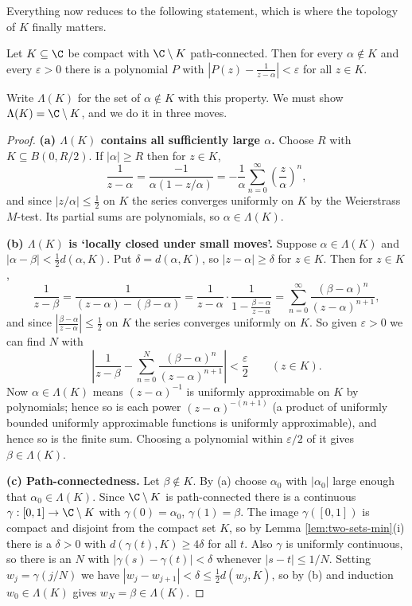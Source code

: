 Everything now reduces to the following statement, which is where the topology of $K$ finally matters.

\begin{lemma}\label{lem:runge-pole-poly}
	Let $K\subseteq\C$ be compact with $\C\setminus K$ path-connected. Then for every $\alpha\notin K$ and every $\varepsilon>0$ there is a polynomial $P$ with $\left|P(z)-\frac{1}{z-\alpha}\right|<\varepsilon$ for all $z\in K$.
\end{lemma}

Write $\Lambda(K)$ for the set of $\alpha \notin K$ with this property. We must show $\Lambda(K) = \C\setminus K$, and we do it in three moves.

\begin{proof}
	\textbf{(a) $\Lambda(K)$ contains all sufficiently large $\alpha$.} Choose $R$ with $K\subseteq B(0,R/2)$. If $|\alpha|\geq R$ then for $z \in K$,
	$$\frac{1}{z-\alpha} = \frac{-1}{\alpha(1-z/\alpha)} = -\frac1\alpha\sum_{n=0}^\infty\left(\frac z\alpha\right)^n,$$
	and since $|z/\alpha|\leq\frac12$ on $K$ the series converges uniformly on $K$ by the Weierstrass $M$-test. Its partial sums are polynomials, so $\alpha\in\Lambda(K)$.

	\textbf{(b) $\Lambda(K)$ is `locally closed under small moves'.} Suppose $\alpha\in\Lambda(K)$ and $|\alpha-\beta|<\tfrac12 d(\alpha,K)$. Put $\delta = d(\alpha,K)$, so $|z-\alpha|\geq\delta$ for $z\in K$. Then for $z \in K$,
	$$\frac{1}{z-\beta} = \frac{1}{(z-\alpha)-(\beta-\alpha)} = \frac{1}{z-\alpha}\cdot\frac{1}{1-\frac{\beta-\alpha}{z-\alpha}} = \sum_{n=0}^\infty\frac{(\beta-\alpha)^n}{(z-\alpha)^{n+1}},$$
	and since $\left|\frac{\beta-\alpha}{z-\alpha}\right|\leq\frac12$ on $K$ the series converges uniformly on $K$. So given $\varepsilon>0$ we can find $N$ with
	$$\left|\frac{1}{z-\beta}-\sum_{n=0}^N\frac{(\beta-\alpha)^n}{(z-\alpha)^{n+1}}\right| < \frac\varepsilon2 \qquad (z \in K).$$
	Now $\alpha\in\Lambda(K)$ means $(z-\alpha)^{-1}$ is uniformly approximable on $K$ by polynomials; hence so is each power $(z-\alpha)^{-(n+1)}$ (a product of uniformly bounded uniformly approximable functions is uniformly approximable), and hence so is the finite sum. Choosing a polynomial within $\varepsilon/2$ of it gives $\beta\in\Lambda(K)$.

	\textbf{(c) Path-connectedness.} Let $\beta\notin K$. By (a) choose $\alpha_0$ with $|\alpha_0|$ large enough that $\alpha_0 \in \Lambda(K)$. Since $\C\setminus K$ is path-connected there is a continuous $\gamma:[0,1]\to\C\setminus K$ with $\gamma(0)=\alpha_0$, $\gamma(1)=\beta$. The image $\gamma([0,1])$ is compact and disjoint from the compact set $K$, so by Lemma \ref{lem:two-sets-min}(i) there is a $\delta>0$ with $d(\gamma(t),K)\geq 4\delta$ for all $t$. Also $\gamma$ is uniformly continuous, so there is an $N$ with $|\gamma(s)-\gamma(t)|<\delta$ whenever $|s-t|\leq 1/N$. Setting $w_j = \gamma(j/N)$ we have $|w_j - w_{j+1}| < \delta \leq \tfrac12 d(w_j,K)$, so by (b) and induction $w_0\in\Lambda(K)$ gives $w_N = \beta\in\Lambda(K)$.
\end{proof}

